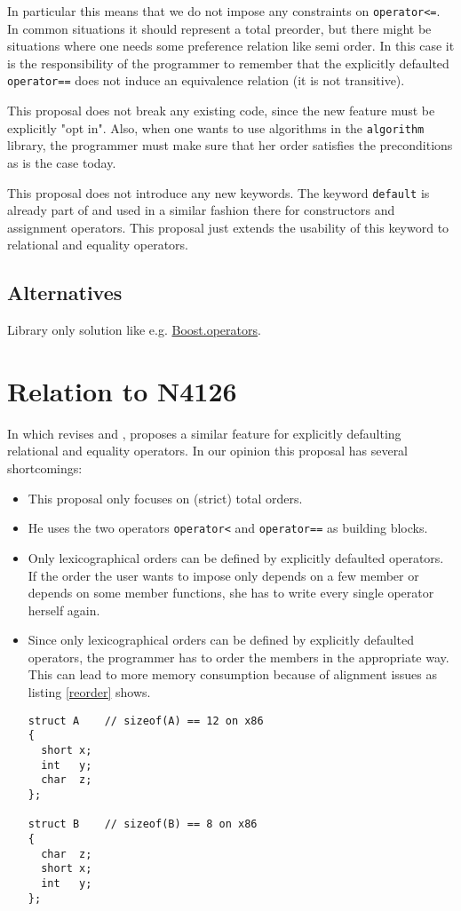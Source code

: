 ﻿\documentclass[a4paper,11pt,twoside,final]{article}
\newcommand{\tcode}[1]{\lstinline[basicstyle=\normalsize\ttfamily]{#1}}
\numberwithin{equation}{subsection}
\begin{document}
In particular this means that we do not impose any constraints on \tcode{operator<=}. In common situations it should represent a total preorder, but there might be situations where one needs some preference relation like semi order. In this case it is the responsibility of the programmer to remember that the explicitly defaulted \tcode{operator==} does not induce an equivalence relation (it is not transitive).\par

This proposal does not break any existing code, since the new feature must be explicitly "opt in". Also, when one wants to use algorithms in the \verb|algorithm| library, the programmer must make sure that her order satisfies the preconditions as is the case today.\par

This proposal does not introduce any new keywords. The keyword \tcode{default} is already part of  and used in a similar fashion there for constructors and assignment operators. This proposal just extends the usability of this keyword to relational and equality operators.

\subsection{Alternatives}
Library only solution like e.g. \href{http://www.boost.org/doc/libs/1_56_0/libs/utility/operators.htm}{Boost.operators}.

\section{Relation to N4126}
In  which revises  and , \citeauthor{oleg3} proposes a similar feature for explicitly defaulting relational and equality operators. In our opinion this proposal has several shortcomings:

\begin{itemize}
\item This proposal only focuses on (strict) total orders.
\item He uses the two operators \tcode{operator<} and \tcode{operator==} as building blocks.
\item Only lexicographical orders can be defined by explicitly defaulted operators. If the order the user wants to impose only depends on a few member or depends on some member functions, she has to write every single operator herself again.
\item Since only lexicographical orders can be defined by explicitly defaulted operators, the programmer has to order the members in the appropriate way. This can lead to more memory consumption because of alignment issues as listing \ref{reorder} shows.
\begin{lstlisting}[caption=Different order of members leads to different size in memory,label=reorder]
struct A    // sizeof(A) == 12 on x86 
{
  short x;
  int   y;
  char  z;
};

struct B    // sizeof(B) == 8 on x86
{
  char  z;
  short x;
  int   y; 
};
\end{lstlisting}

\end{itemize}
\end{document}
